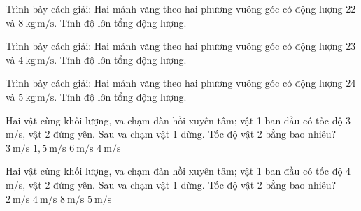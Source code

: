 \begin{bt}
Trình bày cách giải: Hai mảnh văng theo hai phương vuông góc có động lượng $22$ và $8\ \mathrm{kg\,m/s}$. Tính độ lớn tổng động lượng.
\end{bt}

\begin{bt}
Trình bày cách giải: Hai mảnh văng theo hai phương vuông góc có động lượng $23$ và $4\ \mathrm{kg\,m/s}$. Tính độ lớn tổng động lượng.
\end{bt}

\begin{bt}
Trình bày cách giải: Hai mảnh văng theo hai phương vuông góc có động lượng $24$ và $5\ \mathrm{kg\,m/s}$. Tính độ lớn tổng động lượng.
\end{bt}

\begin{ex}
Hai vật cùng khối lượng, va chạm đàn hồi xuyên tâm; vật 1 ban đầu có tốc độ $3$ m/s, vật 2 đứng yên. Sau va chạm vật 1 dừng. Tốc độ vật 2 bằng bao nhiêu?
\choice
{\True $3\ \mathrm{m/s}$}
{$1,5\ \mathrm{m/s}$}
{$6\ \mathrm{m/s}$}
{$4\ \mathrm{m/s}$}
\end{ex}

\begin{ex}
Hai vật cùng khối lượng, va chạm đàn hồi xuyên tâm; vật 1 ban đầu có tốc độ $4$ m/s, vật 2 đứng yên. Sau va chạm vật 1 dừng. Tốc độ vật 2 bằng bao nhiêu?
\choice
{$2\ \mathrm{m/s}$}
{\True $4\ \mathrm{m/s}$}
{$8\ \mathrm{m/s}$}
{$5\ \mathrm{m/s}$}
\end{ex}

